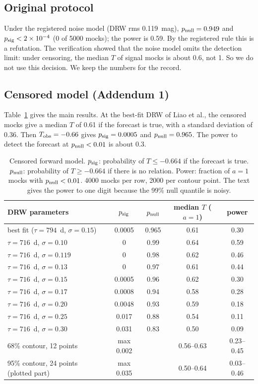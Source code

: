 \documentclass[11pt]{article}
\newcommand{\Tobs}{T_{\rm obs}}
\newcommand{\psig}{p_{\rm sig}}
\newcommand{\pnull}{p_{\rm null}}
\begin{document}
\subsection{Original protocol}
Under the registered noise model (DRW rms 0.119~mag), $\pnull = 0.949$ and $\psig < 2\times10^{-4}$ (0 of 5000 mocks); the power is 0.59. By the registered rule this is a refutation. The verification showed that the noise model omits the detection limit: under censoring, the median $T$ of signal mocks is about 0.6, not 1. So we do not use this decision. We keep the numbers for the record.

\subsection{Censored model (Addendum 1)}
Table~\ref{tab:censored} gives the main results. At the best-fit DRW of Liao et al., the censored mocks give a median $T$ of 0.61 if the forecast is true, with a standard deviation of 0.36. Then $\Tobs = -0.66$ gives $\psig = 0.0005$ and $\pnull = 0.965$. The power to detect the forecast at $\pnull < 0.01$ is about 0.3.

\begin{table}[t]
\centering
\caption{Censored forward model. $\psig$: probability of $T \le -0.664$ if the forecast is true. $\pnull$: probability of $T \ge -0.664$ if there is no relation. Power: fraction of $a = 1$ mocks with $\pnull < 0.01$. 4000 mocks per row, 2000 per contour point. The text gives the power to one digit because the 99\% null quantile is noisy.}
\label{tab:censored}
\begin{tabular}{lcccc}
\toprule
DRW parameters & $\psig$ & $\pnull$ & median $T$ ($a=1$) & power \\
\midrule
best fit ($\tau = 794$~d, $\sigma = 0.15$) & 0.0005 & 0.965 & 0.61 & 0.30 \\
$\tau = 716$~d, $\sigma = 0.10$ & 0 & 0.99 & 0.64 & 0.59 \\
$\tau = 716$~d, $\sigma = 0.119$ & 0 & 0.98 & 0.62 & 0.46 \\
$\tau = 716$~d, $\sigma = 0.13$ & 0 & 0.97 & 0.61 & 0.44 \\
$\tau = 716$~d, $\sigma = 0.15$ & 0.0005 & 0.96 & 0.62 & 0.30 \\
$\tau = 716$~d, $\sigma = 0.17$ & 0.0008 & 0.94 & 0.58 & 0.28 \\
$\tau = 716$~d, $\sigma = 0.20$ & 0.0048 & 0.93 & 0.59 & 0.18 \\
$\tau = 716$~d, $\sigma = 0.25$ & 0.017 & 0.88 & 0.54 & 0.11 \\
$\tau = 716$~d, $\sigma = 0.30$ & 0.031 & 0.83 & 0.50 & 0.09 \\
68\% contour, 12 points & max 0.002 & & 0.56--0.63 & 0.23--0.45 \\
95\% contour, 24 points (plotted part) & max 0.035 & & 0.50--0.64 & 0.03--0.46 \\
\bottomrule
\end{tabular}
\end{table}
\end{document}
